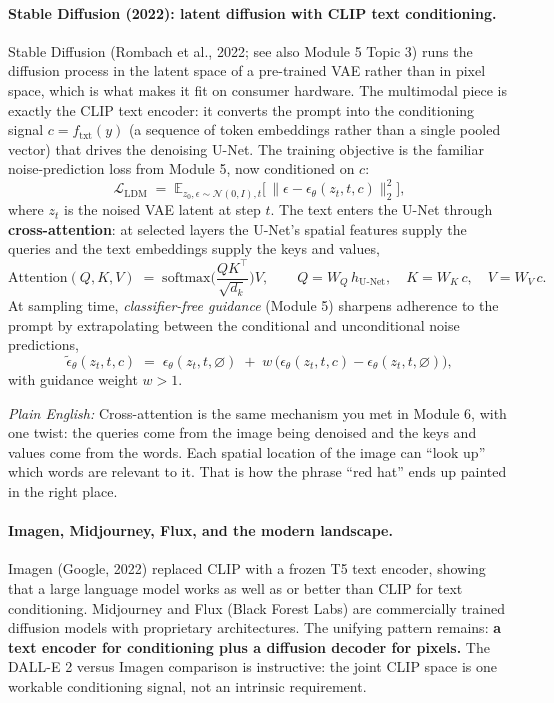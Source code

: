 \documentclass[11pt]{article}
\newcommand{\E}{\mathbb{E}}
\theoremstyle{remark}
\newcommand{\ftxt}{f_{\text{txt}}}
\newcommand{\plain}[1]{\medskip\noindent\textit{Plain English:} #1\medskip}
\begin{document}
\paragraph{Stable Diffusion (2022): latent diffusion with CLIP text conditioning.}
Stable Diffusion (Rombach et al., 2022; see also Module 5 Topic 3) runs the diffusion process in the latent space of a pre-trained VAE rather than in pixel space, which is what makes it fit on consumer hardware. The multimodal piece is exactly the CLIP text encoder: it converts the prompt into the conditioning signal $c = \ftxt(y)$ (a sequence of token embeddings rather than a single pooled vector) that drives the denoising U-Net. The training objective is the familiar noise-prediction loss from Module 5, now conditioned on $c$:
\begin{equation}
\mathcal{L}_{\text{LDM}} \;=\; \E_{z_0, \epsilon \sim \mathcal{N}(0,I), t}\Big[\, \big\|\epsilon - \epsilon_\theta(z_t, t, c)\big\|_2^2 \Big],
\label{eq:ldm}
\end{equation}
where $z_t$ is the noised VAE latent at step $t$. The text enters the U-Net through \textbf{cross-attention}: at selected layers the U-Net's spatial features supply the queries and the text embeddings supply the keys and values,
\begin{equation}
\mathrm{Attention}(Q, K, V) \;=\; \mathrm{softmax}\!\Big(\frac{QK^{\top}}{\sqrt{d_k}}\Big) V,
\qquad Q = W_Q\, h_{\text{U-Net}},\quad K = W_K\, c,\quad V = W_V\, c .
\label{eq:crossattn}
\end{equation}
At sampling time, \emph{classifier-free guidance} (Module 5) sharpens adherence to the prompt by extrapolating between the conditional and unconditional noise predictions,
\[
\tilde{\epsilon}_\theta(z_t, t, c) \;=\; \epsilon_\theta(z_t, t, \varnothing) \;+\; w\,\big(\epsilon_\theta(z_t, t, c) - \epsilon_\theta(z_t, t, \varnothing)\big),
\]
with guidance weight $w > 1$.

\plain{Cross-attention is the same mechanism you met in Module 6, with one twist: the queries come from the image being denoised and the keys and values come from the words. Each spatial location of the image can ``look up'' which words are relevant to it. That is how the phrase ``red hat'' ends up painted in the right place.}

\paragraph{Imagen, Midjourney, Flux, and the modern landscape.}
Imagen (Google, 2022) replaced CLIP with a frozen T5 text encoder, showing that a large language model works as well as or better than CLIP for text conditioning. Midjourney and Flux (Black Forest Labs) are commercially trained diffusion models with proprietary architectures. The unifying pattern remains: \textbf{a text encoder for conditioning plus a diffusion decoder for pixels.} The DALL-E 2 versus Imagen comparison is instructive: the joint CLIP space is one workable conditioning signal, not an intrinsic requirement.
\end{document}
